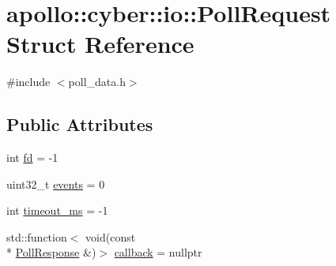 \hypertarget{structapollo_1_1cyber_1_1io_1_1PollRequest}{\section{apollo\-:\-:cyber\-:\-:io\-:\-:Poll\-Request Struct Reference}
\label{structapollo_1_1cyber_1_1io_1_1PollRequest}
}


{\ttfamily \#include $<$poll\-\_\-data.\-h$>$}

\subsection*{Public Attributes}
\begin{DoxyCompactItemize}
\item 
int \hyperlink{structapollo_1_1cyber_1_1io_1_1PollRequest_ab3f2f7ba232afefcce9a9a8f398e2bf6}{fd} = -\/1
\item 
uint32\-\_\-t \hyperlink{structapollo_1_1cyber_1_1io_1_1PollRequest_a9f3f5c8b8e95c755079f430f254d14c8}{events} = 0
\item 
int \hyperlink{structapollo_1_1cyber_1_1io_1_1PollRequest_ace3df86548fb7b6a99583c5abc1cccaa}{timeout\-\_\-ms} = -\/1
\item 
std\-::function$<$ void(const \\*
\hyperlink{structapollo_1_1cyber_1_1io_1_1PollResponse}{Poll\-Response} \&)$>$ \hyperlink{structapollo_1_1cyber_1_1io_1_1PollRequest_a596e0d2d7684c2cc417374f4feabacdb}{callback} = nullptr
\end{DoxyCompactItemize}



